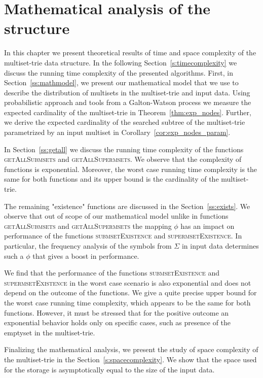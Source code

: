 \documentclass[10pt,letterpaper]{article}
\begin{document}
\section{Mathematical analysis of the structure} \label{c:analysis}
%
In this chapter we present theoretical results of time and space complexity of
the multiset-trie data structure. In the following Section~\ref{s:timecomplexity} 
we discuss the running time complexity of the presented algorithms. First, in 
Section~\ref{ss:mathmodel}, we present our mathematical model that we use 
to describe the distribution of multisets in the multiset-trie and input data. 
Using probabilistic approach and tools from a Galton-Watson process we 
measure the expected cardinality of the multiset-trie in Theorem~\ref{thm:exp_nodes}. 
Further, we derive the expected cardinality of the searched subtree of the 
multiset-trie parametrized by an input multiset in Corollary~\ref{cor:exp_nodes_param}.

In Section~\ref{ss:getall} we discuss the running time complexity of the functions 
\textsc{getAllSubmsets} and \textsc{getAllSupermsets}. We observe that the 
complexity of functions is exponential. Moreover, the worst case running time 
complexity is the same for both functions and its upper bound is the cardinality of 
the multiset-trie.

The remaining "existence" functions are discussed in the Section~\ref{ss:exists}. 
We observe that out of scope of our mathematical model unlike in functions 
\textsc{getAllSubmsets} and \textsc{getAllSupermsets} the mapping $\phi$ has an 
impact on performance of the functions \textsc{submsetExistence} and 
\textsc{supermsetExistence}. In particular, the frequency analysis of the symbols 
from $\Sigma$ in input data determines such a $\phi$ that gives a boost in performance. 

We find that the performance of the functions \textsc{submsetExistence} and 
\textsc{supermsetExistence} in the worst case scenario is also exponential and 
does not depend on the outcome of the functions. We give a quite precise upper 
bound for the worst case running time complexity, which appears to be the same 
for both functions. However, it must be stressed that for the positive outcome an 
exponential behavior holds only on specific cases, such as presence of the emptyset 
in the multiset-trie. 

Finalizing the mathematical analysis, we present the study of space complexity 
of the multiset-trie in the Section~\ref{s:spacecomplexity}. We show that the space 
used for the storage is asymptotically equal to the size of the input data. 
\end{document}

